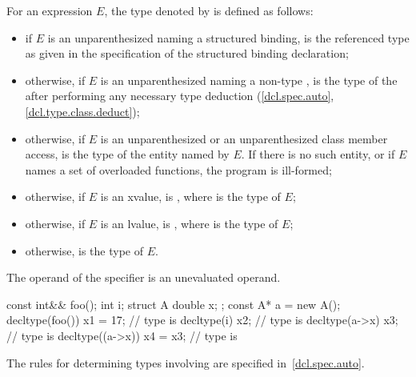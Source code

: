 \pnum
{}%
For an expression $E$, the type denoted by  is defined as follows:
\begin{itemize}
\item if $E$ is an unparenthesized 
naming a structured binding,
 is the referenced type as given in
the specification of the structured binding declaration;

\item otherwise, if $E$ is an unparenthesized 
naming a non-type ,
 is the type of the 
after performing any necessary type deduction
(\ref{dcl.spec.auto}, \ref{dcl.type.class.deduct});

\item otherwise, if $E$ is an unparenthesized  or
an unparenthesized
class
member access,  is the
type of the entity named by $E$. If there is no such entity, or
if $E$ names a set of overloaded functions, the program is
ill-formed;

\item otherwise, if $E$ is
an xvalue,  is , where  is the type
of $E$;

\item otherwise, if $E$ is an lvalue, 
is , where  is the type of $E$;

\item otherwise,  is the type of $E$.
\end{itemize}

The operand of the  specifier is an unevaluated
operand.

\begin{example}
\begin{codeblock}
const int&& foo();
int i;
struct A { double x; };
const A* a = new A();
decltype(foo()) x1 = 17;        // type is 
decltype(i) x2;                 // type is 
decltype(a->x) x3;              // type is 
decltype((a->x)) x4 = x3;       // type is 
\end{codeblock}
\end{example}
\begin{note}
The rules for determining types involving  are specified
in~\ref{dcl.spec.auto}.
\end{note}


